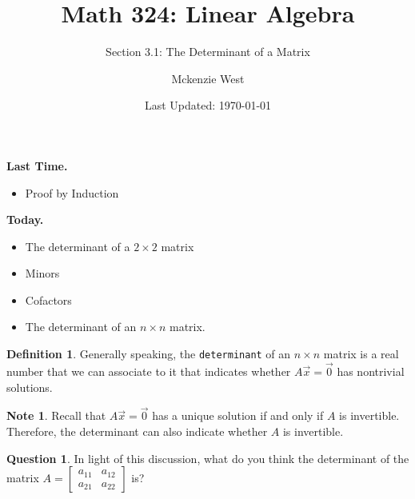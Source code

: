 \documentclass[handout]{beamer}
\newcommand{\fn}{\insertframenumber}
\theoremstyle{definition}
\newtheorem{question}[exercise]{Question}
\newtheorem*{defn}{Definition}
\newtheorem*{nb}{Note}
\renewcommand{\emph}[1]{{\color{blue}\texttt{#1}}}
\begin{document}
	\title{Math 324: Linear Algebra}
	\subtitle{Section 3.1: The Determinant of a Matrix}
	\author{Mckenzie West}
	\date{Last Updated: \today}
\begin{frame}
\maketitle
\end{frame}

\begin{frame}{\insertframenumber}
	\begin{block}{\textbf{Last Time.}}
	\begin{itemize}[label=--]
		\item Proof by Induction
	\end{itemize}
	\end{block}
	\begin{block}{\textbf{Today.}}
		\begin{itemize}[label=--]
			\item The determinant of a $2\times 2$ matrix
			\item Minors
			\item Cofactors
			\item The determinant of an $n\times n$ matrix.
		\end{itemize}
	\end{block}
\end{frame}
\begin{frame}{\fn}
	\begin{defn}
		Generally speaking, the \emph{determinant} of an $n\times n$ matrix is a real number that we can associate to it that indicates whether $A\vec x=\vec 0$ has nontrivial solutions.
	\end{defn}

	\begin{nb}
		Recall that $A\vec x=\vec 0$ has a unique solution if and only if $A$ is invertible.  Therefore, the determinant can also indicate whether $A$ is invertible.
	\end{nb}
	\begin{question}
		In light of this discussion, what do you think the determinant of the matrix $A=\begin{bmatrix}a_{11}&a_{12}\\a_{21}&a_{22}\end{bmatrix}$ is?
	\end{question}
\end{frame}
\end{document}
